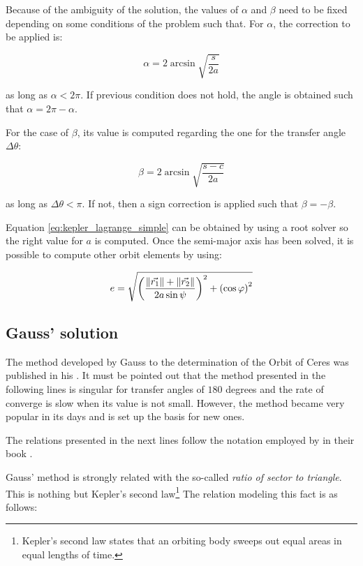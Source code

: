 Because of the ambiguity of the solution, the values of $\alpha$ and $\beta$
need to be fixed depending on some conditions of the problem such that. For
$\alpha$, the correction to be applied is:

\begin{equation}
  \alpha = 2 \arcsin{\sqrt{\frac{s}{2a}}}
\end{equation}

as long as $\alpha < 2\pi$. If previous condition does not hold, the angle is
obtained such that $\alpha = 2\pi - \alpha$.

For the case of $\beta$, its value is computed regarding the one for the
transfer angle $\Delta \theta$:

\begin{equation}
  \beta = 2 \arcsin{\sqrt{\frac{s - c}{2a}}}
\end{equation}

as long as $\Delta \theta < \pi$. If not, then a sign correction is applied such
that $\beta = -\beta$.

Equation \ref{eq:kepler_lagrange_simple} can be obtained by using a root solver
so the right value for $a$ is computed. Once the semi-major axis has been
solved, it is possible to compute other orbit elements by using:

\begin{equation}
  e = \sqrt{\left( \frac{\lVert\vec{r_{1}}\rVert +
      \lVert\vec{r_{2}}\rVert}{2a\sin{\psi}} \right)^{2} + \left(\cos{\varphi} \right)^2}
\end{equation}

\subsection{Gauss' solution}

The method developed by Gauss to the determination of the Orbit of Ceres was
published in his . It must be pointed out that the method
presented in the following lines is singular for transfer angles of $180$
degrees and the rate of converge is slow when its value is not small. However,
the method became very popular in its days and is set up the basis for new ones.

The relations presented in the next lines follow the notation employed by
\citeauthor{bate1979} in their book .

Gauss' method is strongly related with the so-called \textit{ratio of sector to
  triangle}. This is nothing but Kepler's second law\footnote{Kepler's second law
  states that an orbiting body sweeps out equal areas in equal lengths of time.}
The relation modeling this fact is as follows:


